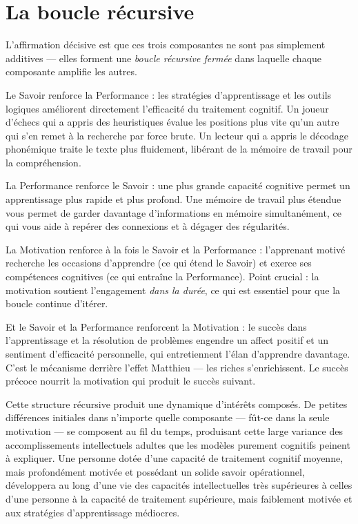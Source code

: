 \documentclass[11pt, twoside, openright]{book}
\begin{document}
\section*{La boucle récursive}

L'affirmation décisive est que ces trois composantes ne sont pas simplement additives --- elles forment une \textit{boucle récursive fermée} dans laquelle chaque composante amplifie les autres.

Le Savoir renforce la Performance : les stratégies d'apprentissage et les outils logiques améliorent directement l'efficacité du traitement cognitif. Un joueur d'échecs qui a appris des heuristiques évalue les positions plus vite qu'un autre qui s'en remet à la recherche par force brute. Un lecteur qui a appris le décodage phonémique traite le texte plus fluidement, libérant de la mémoire de travail pour la compréhension.

La Performance renforce le Savoir : une plus grande capacité cognitive permet un apprentissage plus rapide et plus profond. Une mémoire de travail plus étendue vous permet de garder davantage d'informations en mémoire simultanément, ce qui vous aide à repérer des connexions et à dégager des régularités.

La Motivation renforce à la fois le Savoir et la Performance : l'apprenant motivé recherche les occasions d'apprendre (ce qui étend le Savoir) et exerce ses compétences cognitives (ce qui entraîne la Performance). Point crucial : la motivation soutient l'engagement \textit{dans la durée}, ce qui est essentiel pour que la boucle continue d'itérer.

Et le Savoir et la Performance renforcent la Motivation : le succès dans l'apprentissage et la résolution de problèmes engendre un affect positif et un sentiment d'efficacité personnelle, qui entretiennent l'élan d'apprendre davantage. C'est le mécanisme derrière l'effet Matthieu --- les riches s'enrichissent. Le succès précoce nourrit la motivation qui produit le succès suivant.

Cette structure récursive produit une dynamique d'intérêts composés. De petites différences initiales dans n'importe quelle composante --- fût-ce dans la seule motivation --- se composent au fil du temps, produisant cette large variance des accomplissements intellectuels adultes que les modèles purement cognitifs peinent à expliquer. Une personne dotée d'une capacité de traitement cognitif moyenne, mais profondément motivée et possédant un solide savoir opérationnel, développera au long d'une vie des capacités intellectuelles très supérieures à celles d'une personne à la capacité de traitement supérieure, mais faiblement motivée et aux stratégies d'apprentissage médiocres.
\end{document}
